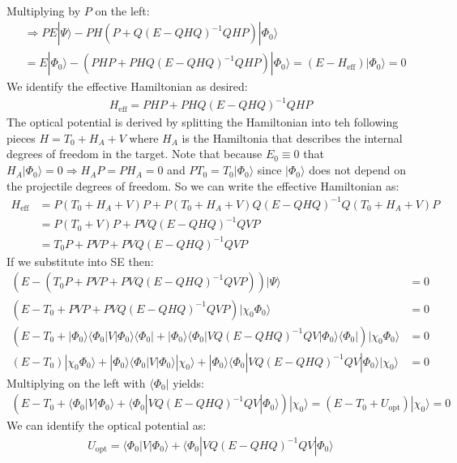 \documentclass[fleqn, 12pt]{article}
\begin{document}
\begin{enumerate}
\begin{align*}
  \end{align*}
  Multiplying by $P$ on the left:
  \begin{align*}
    &\Rightarrow PE|\Psi\rangle-PH\left(P+Q(E-QHQ)^{-1}QHP\right)|\Phi_{0}\rangle \\
    &=E|\Phi_{0}\rangle-(PHP+PHQ(E-QHQ)^{-1}QHP)|\Phi_{0}\rangle=\left(E-H_{\text{eff}}\right)|\Phi_{0}\rangle=0
  \end{align*}
  We identify the effective Hamiltonian as desired:
  \begin{align*}
    H_{\text{eff}}=PHP+PHQ(E-QHQ)^{-1}QHP
  \end{align*}
  The optical potential is derived by splitting the Hamiltonian into teh
  following pieces $H=T_{0}+H_{A}+V$ where $H_{A}$ is the Hamiltonia that
  describes the internal degrees of freedom in the target. Note that because
  $E_{0}\equiv0$ that $H_{A}|\Phi_{0}\rangle=0\Rightarrow H_{A}P=PH_{A}=0$ and
  $PT_{0}=T_{0}|\Phi_{0}\rangle$ since $|\Phi_{0}\rangle$ does not depend on
  the projectile degrees of freedom. So we can write the effective Hamiltonian
  as:
  \begin{align*}
    H_{\text{eff}}
    &=P\left(T_{0}+H_{A}+V\right)P+P\left(T_{0}+H_{A}+V\right)Q(E-QHQ)^{-1}Q\left(T_{0}+H_{A}+V\right)P \\
    &=P\left(T_{0}+V\right)P+PVQ(E-QHQ)^{-1}QVP \\
    &=T_{0}P+PVP+PVQ(E-QHQ)^{-1}QVP
  \end{align*}
  If we substitute into SE then:
  {\small
    \begin{align*}
      \left(E-\left(T_{0}P+PVP+PVQ(E-QHQ)^{-1}QVP\right)\right)|\Psi\rangle&=0 \\
      \left(E-T_{0}+PVP+PVQ(E-QHQ)^{-1}QVP\right)|\chi_{0}\Phi_{0}\rangle&=0 \\
      \left(E-T_{0}+|\Phi_{0}\rangle\langle\Phi_{0}|V|\Phi_{0}\rangle\langle\Phi_{0}|+|\Phi_{0}\rangle\langle\Phi_{0}|VQ(E-QHQ)^{-1}QV|\Phi_{0}\rangle\langle\Phi_{0}|\right)|\chi_{0}\Phi_{0}\rangle&=0 \\
      \left(E-T_{0}\right)|\chi_{0}\Phi_{0}\rangle+|\Phi_{0}\rangle\langle\Phi_{0}|V|\Phi_{0}\rangle|\chi_{0}\rangle+|\Phi_{0}\rangle\langle\Phi_{0}|VQ(E-QHQ)^{-1}QV|\Phi_{0}\rangle|\chi_{0}\rangle&=0
    \end{align*}}
  Multiplying on the left with $\langle\Phi_{0}|$ yields:
  {\small
    \begin{align*}
      \left(E-T_{0}+\langle\Phi_{0}|V|\Phi_{0}\rangle+\langle\Phi_{0}|VQ(E-QHQ)^{-1}QV|\Phi_{0}\rangle\right)|\chi_{0}\rangle
      =\left(E-T_{0}+U_{\text{opt}}\right)|\chi_{0}\rangle=0
    \end{align*}}
  We can identify the optical potential as:
  \begin{align*}
    U_{\text{opt}}=\langle\Phi_{0}|V|\Phi_{0}\rangle+\langle\Phi_{0}|VQ(E-QHQ)^{-1}QV|\Phi_{0}\rangle
  \end{align*}


\end{enumerate}
\end{document}
